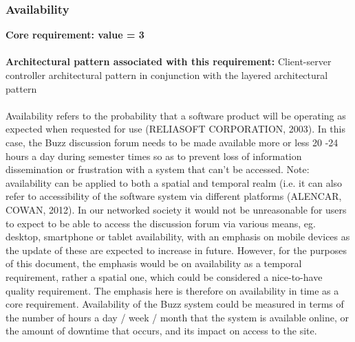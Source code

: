 \documentclass[a4paper]{article}
\begin{document}
\subsubsection{Availability}
\textbf{Core requirement: value = 3}
\\
\\\textbf{Architectural pattern associated with this requirement:} Client-server controller architectural pattern in conjunction with the layered architectural pattern
\\ 
\\Availability refers to the probability that a software product will be operating as expected when requested for use (RELIASOFT CORPORATION, 2003). In this case, the Buzz discussion forum needs to be made available more or less 20 -24 hours a day during semester times so as to prevent loss of information dissemination or frustration with a system that can’t be accessed. Note: availability can be applied to both a spatial and temporal realm (i.e. it can also refer to accessibility of the software system via different platforms (ALENCAR, COWAN, 2012). In our networked society it would not be unreasonable for users to expect to be able to access the discussion forum via various means, eg. desktop, smartphone or tablet availability, with an emphasis on mobile devices as the update of these are expected to increase in future. However, for the purposes of this document, the emphasis would be on availability as a temporal requirement, rather a spatial one, which could be considered a nice-to-have quality requirement. The emphasis here is therefore on availability in time as a core requirement. Availability of the Buzz system could be measured in terms of the number of hours a day / week / month that the system is available online, or the amount of downtime that occurs, and its impact on access to the site.
\end{document}
